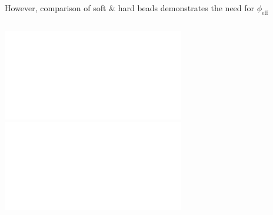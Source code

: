 \documentclass[aspectratio=169]{beamer}
\begin{document}
\begin{frame}[c]{However, comparison of soft \& hard beads demonstrates the need for $\phi_{\mathrm{eff}}$}
  \begin{columns}

    \centering
    \vspace{\baselineskip}


    \centering
    \vspace{\baselineskip}

    \includegraphics<1>[height=0.7\textheight]{../figures/fig-reff_T/subfig-soft_reff.pdf}
    \includegraphics<2>[scale=0.95]{../figures/fig-soft_vs_hard_phase_diag/fig-phase_diag_phi_eff.pdf}

  \end{columns}

\end{frame}
\end{document}
